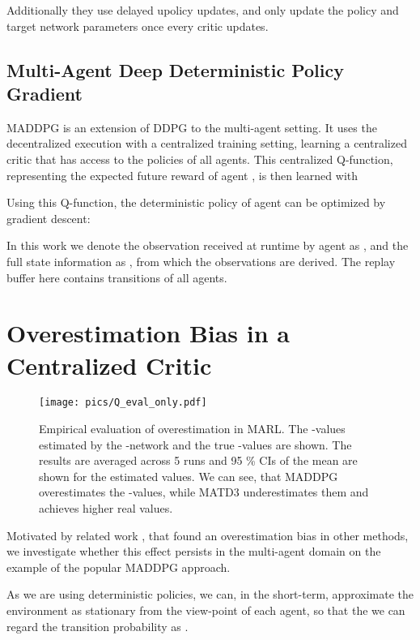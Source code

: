 \documentclass{article}
\begin{document}
Additionally they use delayed upolicy updates, and only update the policy  and target network parameters  once every  critic updates.


\subsection{Multi-Agent Deep Deterministic Policy Gradient}
\label{bg:maddpg}
\gls*{MADDPG} \cite{Lowe2017} is an extension of \gls*{DDPG} to the multi-agent setting. 
It uses the decentralized execution with a centralized training setting, learning a centralized critic that has access to the policies of all agents.
This centralized Q-function, representing the expected future reward of agent , is then learned with

Using this Q-function, the deterministic policy of agent  can be optimized by gradient descent:

In this work we denote the observation received at runtime by agent  as , and the full state information as , from which the observations  are derived.
The replay buffer  here contains transitions  of all agents. 

\section{Overestimation Bias in a Centralized Critic}
\label{sec:overestimation}
\begin{wrapfigure}[18]{r}{0.5\textwidth}
	\texttt{[image: pics/Q\_eval\_only.pdf]}
	\centering
	\caption{Empirical evaluation of overestimation in MARL. The -values estimated by the -network and the true -values are shown. The results are averaged across 5 runs and 95 \% CIs of the mean are shown for the estimated values. We can see, that MADDPG overestimates the -values, while MATD3 underestimates them and achieves higher real values.}
	\label{fig:overestimation} 	
\end{wrapfigure}
Motivated by related work \cite{Fujimoto2018,VanHasselt2010,VanHasselt2015}, that found an overestimation bias in other methods, we investigate whether this effect persists in the multi-agent domain on the example of the popular \gls*{MADDPG} approach.



As we are using deterministic policies, we can, in the short-term, approximate the environment as stationary from the view-point of each agent, so that the we can regard the transition probability as .
\end{document}

